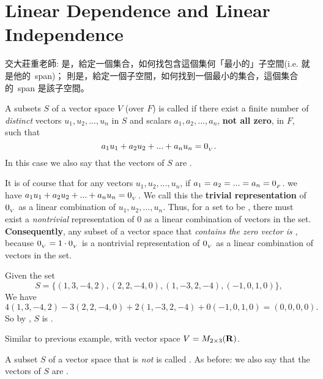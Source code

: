 \section{Linear Dependence and Linear Independence} \label{sec 1.5}

\begin{note}
交大莊重老師:  是，給定一個集合，如何找包含這個集何「最小的」子空間(i.e. 就是他的\ span)；
 則是，給定一個子空間，如何找到一個最小的集合，這個集合的\ span 是該子空間。
\end{note}

\begin{definition} \label{def 1.6}
A subsets \(S\) of a vector space \(V\) (over \(F\)) is called \textbf{\LDP{}} if there exist a finite number of \emph{distinct} vectors \(u_1, u_2, ..., u_n\) in \(S\) and scalars \(a_1, a_2, ..., a_n\), \textbf{not all zero}, in \(F\), such that
\[
    a_1 u_1 + a_2 u_2 + ... + a_n u_n = 0_{_V}.
\]
In this case we also say that the vectors of \(S\) are \LDP{}.
\end{definition}

\begin{additional definition} \label{adef 1.10}
It is of course that for any vectors \(u_1, u_2, ..., u_n\), if \(a_1 = a_2 = ... = a_n = 0_{_F}\). we have \(a_1 u_1 + a_2 u_2 + ... + a_n u_n = 0_{_V}\).
We call this the \textbf{trivial representation} of \(0_{_V}\) as a linear combination of \(u_1, u_2, ..., u_n\).
Thus, for a set to be \LDP{}, there must exist a \emph{nontrivial} representation of \(0\) as a linear combination of vectors in the set.
\textbf{Consequently}, any subset of a vector space that \emph{contains the zero vector is \LDP{}}, because \(0_{_V} = 1 \cdot 0_{_V}\) is a nontrivial representation of \(0_{_V}\) as a linear combination of vectors in the set.
\end{additional definition}

\begin{example}
Given the set
\[
    S = \{(1, 3, -4, 2), (2, 2, -4, 0), (1, -3, 2, -4), ( -1, 0, 1, 0)\},
\]
We have
\[
    4(1, 3, -4, 2) - 3(2, 2, -4, 0) + 2(1, -3, 2, -4) + 0( -1 , 0, 1, 0) = (0, 0, 0, 0).
\]
So by , \(S\) is \LDP{}.
\end{example}

\begin{example}
Similar to previous example, with vector space \(V = M_{2 \times 3}(\mathbf{R})\).
\end{example}

\begin{definition} \label{def 1.7}
A subset \(S\) of a vector space that is \emph{not} \LDP{} is called \textbf{\LID{}}.
As before: we also say that the vectors of \(S\) are \LID{}.
\end{definition}

